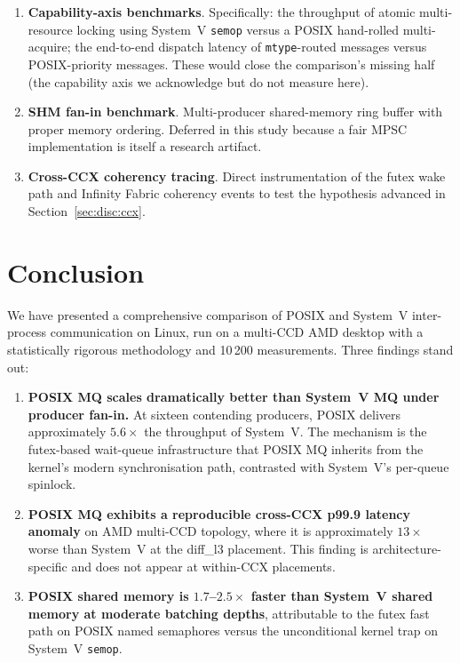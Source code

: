 \documentclass[a4paper,11pt]{article}
\begin{document}
\begin{enumerate}[leftmargin=*]
\item \textbf{Capability-axis benchmarks}. Specifically: the
throughput of atomic multi-resource locking using System~V
\texttt{semop} versus a POSIX hand-rolled multi-acquire; the
end-to-end dispatch latency of \texttt{mtype}-routed messages versus
POSIX-priority messages. These would close the comparison's missing
half (the capability axis we acknowledge but do not measure here).
\item \textbf{SHM fan-in benchmark}. Multi-producer shared-memory ring
buffer with proper memory ordering. Deferred in this study because a
fair MPSC implementation is itself a research artifact.
\item \textbf{Cross-CCX coherency tracing}. Direct instrumentation of
the futex wake path and Infinity Fabric coherency events to test the
hypothesis advanced in Section~\ref{sec:disc:ccx}.
\end{enumerate}

\section{Conclusion}
\label{sec:conclusion}

We have presented a comprehensive comparison of POSIX and System~V
inter-process communication on Linux, run on a multi-CCD AMD desktop
with a statistically rigorous methodology and 10\,200 measurements.
Three findings stand out:

\begin{enumerate}[leftmargin=*]
\item \textbf{POSIX MQ scales dramatically better than System~V MQ
under producer fan-in.} At sixteen contending producers, POSIX
delivers approximately $5.6\times$ the throughput of System~V. The
mechanism is the futex-based wait-queue infrastructure that POSIX MQ
inherits from the kernel's modern synchronisation path, contrasted
with System~V's per-queue spinlock.
\item \textbf{POSIX MQ exhibits a reproducible cross-CCX p99.9 latency
anomaly} on AMD multi-CCD topology, where it is approximately
$13\times$ worse than System~V at the diff\_l3 placement.
This finding is architecture-specific and does not appear at
within-CCX placements.
\item \textbf{POSIX shared memory is $1.7$--$2.5\times$ faster than
System~V shared memory at moderate batching depths}, attributable to
the futex fast path on POSIX named semaphores versus the
unconditional kernel trap on System~V \texttt{semop}.
\end{enumerate}
\end{document}
